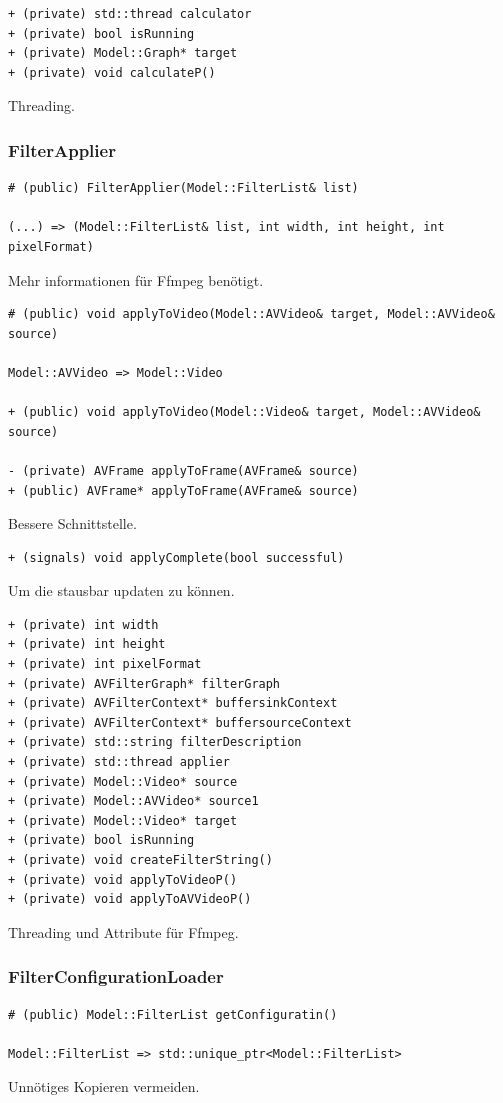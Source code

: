 \documentclass{scrartcl}
\begin{document}
{\begin{verbatim}
+ (private) std::thread calculator
+ (private) bool isRunning
+ (private) Model::Graph* target
+ (private) void calculateP()
\end{verbatim}
Threading.
\subsubsection{FilterApplier}
\begin{verbatim}
# (public) FilterApplier(Model::FilterList& list)

(...) => (Model::FilterList& list, int width, int height, int pixelFormat)
\end{verbatim}
Mehr informationen für Ffmpeg benötigt.
\bigskip
\begin{verbatim}
# (public) void applyToVideo(Model::AVVideo& target, Model::AVVideo& source)

Model::AVVideo => Model::Video

+ (public) void applyToVideo(Model::Video& target, Model::AVVideo& source)

- (private) AVFrame applyToFrame(AVFrame& source)
+ (public) AVFrame* applyToFrame(AVFrame& source)
\end{verbatim}
Bessere Schnittstelle.
\bigskip
\begin{verbatim}
+ (signals) void applyComplete(bool successful)
\end{verbatim}
Um die stausbar updaten zu können.
\bigskip
\begin{verbatim}
+ (private) int width
+ (private) int height
+ (private) int pixelFormat
+ (private) AVFilterGraph* filterGraph
+ (private) AVFilterContext* buffersinkContext
+ (private) AVFilterContext* buffersourceContext
+ (private) std::string filterDescription
+ (private) std::thread applier
+ (private) Model::Video* source
+ (private) Model::AVVideo* source1
+ (private) Model::Video* target
+ (private) bool isRunning
+ (private) void createFilterString()
+ (private) void applyToVideoP()
+ (private) void applyToAVVideoP()
\end{verbatim}
Threading und Attribute für Ffmpeg.
\newpage
\subsubsection{FilterConfigurationLoader}
\begin{verbatim}
# (public) Model::FilterList getConfiguratin()

Model::FilterList => std::unique_ptr<Model::FilterList>
\end{verbatim}
Unnötiges Kopieren vermeiden.
\bigskip
}
\end{document}
